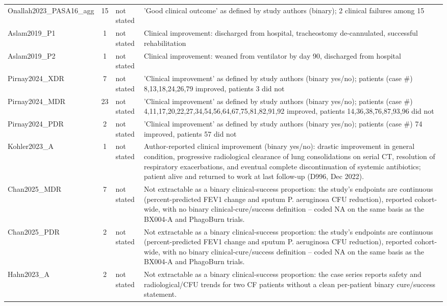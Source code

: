 \begin{tabular}{p{2.6cm}cp{1.5cm}p{8.4cm}}
Onallah2023\_PASA16\_agg & 15 & not stated & 'Good clinical outcome' as defined by study authors (binary); 2 clinical failures among 15 \\
Aslam2019\_P1 & 1 & not stated & Clinical improvement: discharged from hospital, tracheostomy de-cannulated, successful rehabilitation \\
Aslam2019\_P2 & 1 & not stated & Clinical improvement: weaned from ventilator by day 90, discharged from hospital \\
Pirnay2024\_XDR & 7 & not stated & 'Clinical improvement' as defined by study authors (binary yes/no); patients (case \#) 8,13,18,24,26,79 improved, patients 3 did not \\
Pirnay2024\_MDR & 23 & not stated & 'Clinical improvement' as defined by study authors (binary yes/no); patients (case \#) 4,11,17,20,22,27,34,54,56,64,67,75,81,82,91,92 improved, patients 14,36,38,76,87,93,96 did not \\
Pirnay2024\_PDR & 2 & not stated & 'Clinical improvement' as defined by study authors (binary yes/no); patients (case \#) 74 improved, patients 57 did not \\
Kohler2023\_A & 1 & not stated & Author-reported clinical improvement (binary yes/no): drastic improvement in general condition, progressive radiological clearance of lung consolidations on serial CT, resolution of respiratory exacerbations, and eventual complete discontinuation of systemic antibiotics; patient alive and returned to work at last follow-up (D996, Dec 2022). \\
Chan2025\_MDR & 7 & not stated & Not extractable as a binary clinical-success proportion: the study's endpoints are continuous (percent-predicted FEV1 change and sputum P. aeruginosa CFU reduction), reported cohort-wide, with no binary clinical-cure/success definition -- coded NA on the same basis as the BX004-A and PhagoBurn trials. \\
Chan2025\_PDR & 2 & not stated & Not extractable as a binary clinical-success proportion: the study's endpoints are continuous (percent-predicted FEV1 change and sputum P. aeruginosa CFU reduction), reported cohort-wide, with no binary clinical-cure/success definition -- coded NA on the same basis as the BX004-A and PhagoBurn trials. \\
Hahn2023\_A & 2 & not stated & Not extractable as a binary clinical-success proportion: the case series reports safety and radiological/CFU trends for two CF patients without a clean per-patient binary cure/success statement. \\

\end{tabular}
